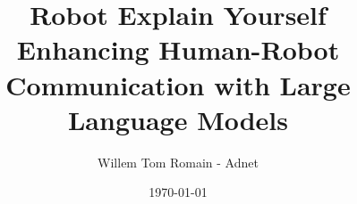 \documentclass[11pt,a4paper]{article}
\begin{document}
\title{Robot Explain Yourself\\
Enhancing Human-Robot Communication with Large Language Models}
\author{Willem Tom Romain - Adnet}
\date{\today}
\maketitle



\tableofcontents
\newpage











\end{document}
